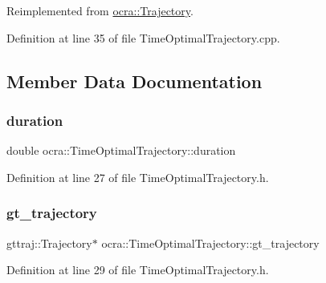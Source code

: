 Reimplemented from \hyperlink{classocra_1_1Trajectory_aa49b123abf79be71f131c138ff2a88b2}{ocra\+::\+Trajectory}.



Definition at line 35 of file Time\+Optimal\+Trajectory.\+cpp.



\subsection{Member Data Documentation}
\hypertarget{classocra_1_1TimeOptimalTrajectory_a6c6b5ffec595af24fd0061d47f85ebdf}{}\label{classocra_1_1TimeOptimalTrajectory_a6c6b5ffec595af24fd0061d47f85ebdf} 
\subsubsection{\texorpdfstring{duration}{duration}}
{\footnotesize\ttfamily double ocra\+::\+Time\+Optimal\+Trajectory\+::duration\hspace{0.3cm}{\ttfamily [protected]}}



Definition at line 27 of file Time\+Optimal\+Trajectory.\+h.

\hypertarget{classocra_1_1TimeOptimalTrajectory_a350a0c047e3f65fc7dd55d6b5dfa5796}{}\label{classocra_1_1TimeOptimalTrajectory_a350a0c047e3f65fc7dd55d6b5dfa5796} 
\subsubsection{\texorpdfstring{gt\+\_\+trajectory}{gt\_trajectory}}
{\footnotesize\ttfamily gttraj\+::\+Trajectory$\ast$ ocra\+::\+Time\+Optimal\+Trajectory\+::gt\+\_\+trajectory\hspace{0.3cm}{\ttfamily [protected]}}



Definition at line 29 of file Time\+Optimal\+Trajectory.\+h.

\hypertarget{classocra_1_1TimeOptimalTrajectory_a7709c9a5e8ab5e48657cc965f59d0f57}{}\label{classocra_1_1TimeOptimalTrajectory_a7709c9a5e8ab5e48657cc965f59d0f57} 
